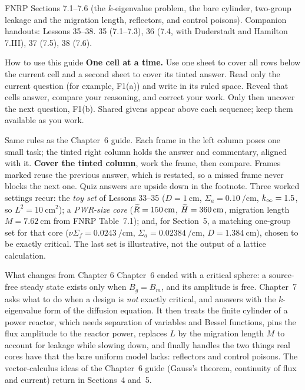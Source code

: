 \documentclass[compact]{ne630handout}
\begin{document}
 {FNRP Sections 7.1--7.6 (the $k$-eigenvalue problem, the bare cylinder, two-group leakage and the migration length, reflectors, and control poisons). Companion handouts: Lessons 35--38.}
 {35 (7.1--7.3), 36 (7.4, with Duderstadt and Hamilton 7.III), 37 (7.5), 38 (7.6).}

\begin{KeyBox}{How to use this guide}
\ifguidehandwriting
\textbf{One cell at a time.} Use one sheet to cover all rows below the current cell and a second sheet to cover its tinted answer. Read only the current question (for example, F1(a)) and write in its ruled space. Reveal that cell\textquotesingle s answer, compare your reasoning, and correct your work. Only then uncover the next question, F1(b). Shared givens appear above each sequence; keep them available as you work.\par\smallskip
\fi
Same rules as the Chapter~6 guide. Each frame in the left column poses one small task; the tinted right column holds the answer and commentary, aligned with it. \textbf{Cover the tinted column}, work the frame, then compare. Frames marked \Chain reuse the previous answer, which is restated, so a missed frame never blocks the next one. Quiz answers are upside down in the footnote. Three worked settings recur: the \emph{toy set} of Lessons 33--35 ($D=\SI{1}{\centi\meter}$, $\Sigma_a=\SI{0.10}{\per\centi\meter}$, $k_\infty=1.5$, so $L^2=\SI{10}{\centi\meter\squared}$); a \emph{PWR-size core} ($\widetilde R=\SI{150}{\centi\meter}$, $\widetilde H=\SI{360}{\centi\meter}$, migration length $M=\SI{7.62}{\centi\meter}$ from FNRP Table~7.1); and, for Section~5, a matching one-group set for that core ($\nu\Sigma_f=\SI{0.0243}{\per\centi\meter}$, $\Sigma_a=\SI{0.02384}{\per\centi\meter}$, $D=\SI{1.384}{\centi\meter}$), chosen to be exactly critical. The last set is illustrative, not the output of a lattice calculation.
\end{KeyBox}

\begin{KeyBox}{What changes from Chapter 6}
Chapter~6 ended with a critical sphere: a source-free steady state exists only when $B_g=B_m$, and its amplitude is free. Chapter~7 asks what to do when a design is \emph{not} exactly critical, and answers with the $k$-eigenvalue form of the diffusion equation. It then treats the finite cylinder of a power reactor, which needs separation of variables and Bessel functions, pins the flux amplitude to the reactor power, replaces $L$ by the migration length $M$ to account for leakage while slowing down, and finally handles the two things real cores have that the bare uniform model lacks: reflectors and control poisons. The vector-calculus ideas of the Chapter~6 guide (Gauss's theorem, continuity of flux and current) return in Sections~4 and~5.
\end{KeyBox}
\end{document}
